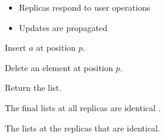 \begin{frame}{}
  \centerline{\Large {}}
  \vspace{-0.20cm}
  

  \pause
  \vspace{-0.50cm}
  \begin{itemize}
    \centering
    \item Replicas respond to user operations 
    \item Updates are propagated 
  \end{itemize}
\end{frame}

\begin{frame}{}
  \centerline{\Large {}}
  \vspace{0.30cm}

  \begin{center}
    \begin{minipage}{0.70\textwidth}
      \begin{description}
	\setlength{\itemsep}{10pt}
	\item[$\textsc{Ins}(a, p):$] Insert $a$ at position $p$.
	\item[$\textsc{Del}(p):$] Delete an element at position $p$.
	\item[$\textsc{Read}:$] Return the list.
      \end{description}
    \end{minipage}
  \end{center}

  \pause
  \vspace{0.80cm}
  \centerline{\large {}}
\end{frame}

\begin{frame}{}
  \begin{definition}
    The final lists at all replicas are identical .
  \end{definition}

  \vspace{-0.30cm}
  \vspace{-0.50cm}

  \begin{definition}
    The lists at the replicas that  are identical.
  \end{definition}

  \pause
  \vspace{0.50cm}
  \centerline{}
\end{frame}

